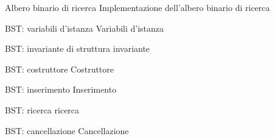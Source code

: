 \documentclass{beamer}
\begin{document}
\begin{frame}{Albero binario di ricerca}
    Implementazione dell'albero binario di ricerca
\end{frame}

\begin{frame}{BST: variabili d'istanza}
    Variabili d'istanza
\end{frame}

\begin{frame}{BST: invariante di struttura}
    invariante
\end{frame}

\begin{frame}{BST: costruttore}
    Costruttore
\end{frame}

\begin{frame}{BST: inserimento}
    Inserimento
\end{frame}

\begin{frame}{BST: ricerca}
    ricerca
\end{frame}

\begin{frame}{BST: cancellazione}
    Cancellazione
\end{frame}
\end{document}
